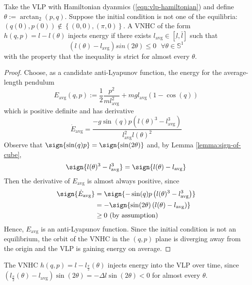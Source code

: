 \begin{thm}\label{thm:vlp-gains-energy}
   Take the VLP with Hamiltonian dyanmics (\ref{eqn:vlp-hamiltonian}) and define
   \(\theta := \arctan_2(p,q)\). Suppose the initial condition is not one of the
   equilibria: \((q(0),p(0)) \not \in \left\{(0,0), (\pi,0)\right\}\).
   A VNHC of the form \(h(q,p) = l - l(\theta)\) injects energy if there exists 
   \(l_\text{avg} \in [\underbar{l},\bar{l}]\) such that 
   \[
      \left(l(\theta) - l_\text{avg}\right)sin(2\theta) \leq 0 \text{ }\forall \theta \in \mathbb{S}^1
   \]
   with the property that the inequality is strict for almost every \(\theta\).
\end{thm}
\begin{proof}
    Choose, as a candidate anti-Lyapunov function, the energy for the average-length pendulum 
    \[
       E_\text{avg}(q,p) := \frac{1}{2}\frac{p^2}{m l_\text{avg}^2} 
                    + m g l_\text{avg} (1-\cos(q))
    \]
    which is positive definite and has derivative 
    \[
      \dot{E}_\text{avg} = \frac{-g\sin(q)p \left(l(\theta)^3 - l_\text{avg}^3\right)}
                 {l_\text{avg}^2l(\theta)^2}
    \]
    Observe that \(\sign{\sin(q)p} = \sign{\sin(2\theta)}\) and, 
    by Lemma \ref{lemma:sign-of-cube},
    \[ 
       \sign{l(\theta)^3 - l_\text{avg}^3} = \sign{ l(\theta) - l_\text{avg}}
    \]
    Then the derivative of \(E_\text{avg}\) is almost always positive, since
    \begin{align*}
       \label{eq:}
       \sign{\dot{E}_\text{avg}} &= \sign{-\sin(q)p \left(l(\theta)^3 - l_\text{avg}^3\right)} \\
                   &= -\sign{\sin(2\theta) \left(l(\theta) - l_\text{avg}\right)} \\
                   &\geq 0 \text{ (by assumption)}
    \end{align*}
    Hence, \(E_\text{avg}\) is an anti-Lyapunov function.
    Since the initial condition is not an equilibrium,
    the orbit of the VNHC in the \((q,p)\) plane is diverging away from the
    origin and the VLP is gaining energy on average.
\end{proof}

\begin{cor}
   The VNHC \(h(q,p) = l - l_\frac{\pi}{2}(\theta)\) injects energy into the VLP
   over time, since 
   \(\left(l_\frac{\pi}{2}(\theta) - l_\text{avg}\right)\sin(2\theta) = 
   -\Delta l \sin(2\theta) < 0\) for almost every \(\theta\).
\end{cor}

